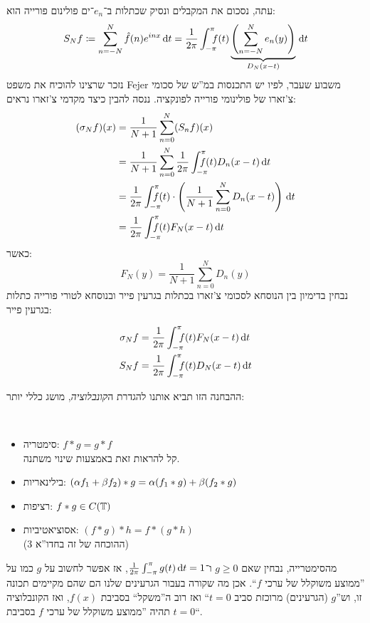 \documentclass[]{../../../../tex/classes/styledArticle}
\begin{document}
	עתה, נסכום את המקבלים ונסיק שכתלות ב־$e_n$־ים פולינום פורייה הוא: 
	\[ S_Nf \cod \sum_{n = -N}^{N} \hat f(n)e^{inx}\dt = \frac{1}{2\pi}\int^{\pi}_{-\pi}\dequad \ f(t)\underbrace{\cl{\sum_{n = -N}^{N}e_n(y)}}_{D_N(x - t)}\dt \]
	נזכר שרצינו להוכיח את משפט Fejer משבוע שעבר, לפיו יש התכנסות במ''ש של סכומי צ'זארו של פולינומי פורייה לפונקציה. ננסה להבין כיצד מקדמי צ'זארו נראים: 
	\begin{align*}
		(\sg_N f)(x) &= \frac{1}{N + 1}\sum^{N}_{n = 0}(S_nf)(x) \\
		&= \frac{1}{N + 1}\sum_{n = 0}^{N}\frac{1}{2\pi}\int^{\pi}_{-\pi}\dequad f(t)D_n(x - t)\dt \\
		&= \frac{1}{2\pi}\int^{\pi}_{-\pi}\dequad f(t) \cdot \cl{\frac{1}{N + 1}\sum_{n = 0}^{N}D_n(x - t)}\dt \\
		&= \frac{1}{2\pi}\int^{\pi}_{-\pi}\dequad f(t)F_N(x - t)\dt
	\end{align*}
	כאשר: 
	\[ F_N(y) = \frac{1}{N + 1}\sum_{n = 0}^{N}D_n(y) \]
	נבחין בדימיון בין הנוסחא לסכומי צ'זארו בכתלות בגרעין פייר ובנוסחא לטורי פורייה כתלות בגרעין פייר: 
	\begin{Claim}\label{clm:1}
		\begin{align*}
			\sg_N f &= \frac{1}{2\pi}\int^{\pi}_{-\pi}\dequad \ f(t)F_N(x - t)\dt \\
			S_Nf &= \frac{1}{2\pi}\int^{\pi}_{-\pi}\dequad \ f(t){D_N(x - t)}\dt
		\end{align*}
	\end{Claim}
	ההבחנה הזו תביא אותנו להגדרת ה\textit{קונבלוציה}, מושג כללי יותר: 
	\begin{Claim}\ 
		\begin{itemize}
			\item סימטריה: \hfil $f * g = g * f$ \\ 
			קל להראות זאת באמצעות שינוי משתנה. 
			\item בילינאריות: \hfil $\left ( \alpha f_1 + \beta f_2 \right ) * g = \alpha (f_1 * g) + \beta (f_2 * g)$
			\item רציפות: \hfil $f * g \in C(\mathbb{T})$
			\item אסוציאטיביות: \hfil $(f * g) * h = f * (g * h)$\\
			(ההוכחה של זה בחדו''א 3)
		\end{itemize}
	\end{Claim}
	מהסימטרייה, נבחין שאם $g \ge 0$ ו־$\frac{1}{2\pi}\int^{\pi}_{-\pi} g(t)\,\mathrm{d}t = 1$, אז אפשר לחשוב על $g$ כמו על ''ממוצע משוקלל של ערכי $f$``. אכן מה שקורה בעבור הגרעינים שלנו הם שהם מקיימים תכונה זו, וש''$g$ (הגרעינים) מרוכזת סביב $t = 0$`` ואז רוב ה''משקל`` בסביבת $f(x)$, ואז הקונבלוציה תהיה ''ממוצע משוקלל של ערכי $f$ בסביבת $t = 0$``. 
	
\end{document}
